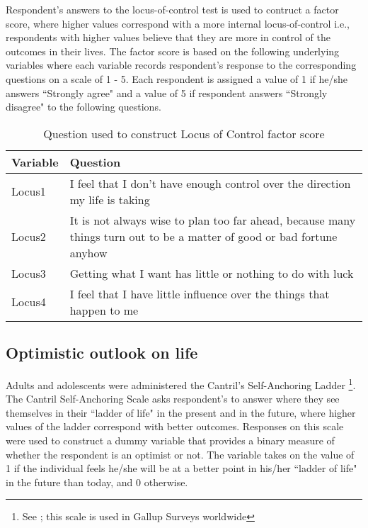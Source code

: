 Respondent's answers to the locus-of-control test is used to contruct a factor score, where higher values correspond with a more internal locus-of-control i.e., respondents with higher values believe that they are more in control of the outcomes in their lives. The factor score is based on the following underlying variables where each variable records respondent's response to the corresponding questions on a scale of 1 - 5. Each respondent is assigned a value of 1 if he/she answers ``Strongly agree" and a value of 5 if respondent answers ``Strongly disagree" to the following questions. \\

\begin{table}[H]
\begin{center}
\footnotesize{
\caption{Question used to construct Locus of Control factor score}
	\begin{tabular}{l L{11cm}}
	\hline
	\textbf{Variable} & \textbf{Question} \\
	\hline
	
	Locus1		& I feel that I don’t have enough control over the direction my life is taking \\	
	Locus2		& It is not always wise to plan too far ahead, because many things turn out to be a matter of good or bad fortune anyhow\\
	Locus3		& Getting what I want has little or nothing to do with luck \\
	Locus4		& I feel that I have little influence over the things that happen to me \\
	
	\hline
	
	\end{tabular}
}

\end{center}
\end{table}

\subsection{Optimistic outlook on life}
Adults and adolescents were administered the Cantril's Self-Anchoring Ladder \footnote{See \cite{Cantril_1965_BOOK_Pattern-Hum-Con}; this scale is used in Gallup Surveys worldwide}. The Cantril Self-Anchoring Scale asks respondent's to answer where they see themselves in their ``ladder of life" in the present and in the future, where higher values of the ladder correspond with better outcomes. Responses on this scale were used to construct a dummy variable that provides a binary measure of whether the respondent is an optimist or not. The variable takes on the value of 1 if the individual feels he/she will be at a better point in his/her ``ladder of life" in the future than today, and 0 otherwise.

